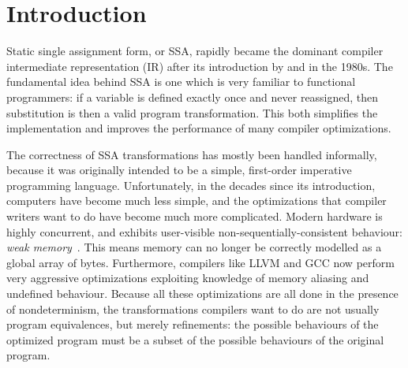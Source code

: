 \documentclass[acmsmall,screen,anonymous,review]{acmart}
\begin{document}

\maketitle

\section{Introduction}

Static single assignment form, or SSA, rapidly became the dominant compiler intermediate
representation (IR) after its introduction by \citet{alpern-ssa-original-88} and
\citet{rosen-gvn-1988} in the 1980s. The fundamental idea behind SSA is one which is very familiar
to functional programmers: if a variable is defined exactly once and never reassigned, then
substitution is then a valid program transformation. This both simplifies the implementation and
improves the performance of many compiler optimizations.

The correctness of SSA transformations has mostly been handled informally, because it was originally
intended to be a simple, first-order imperative programming language. Unfortunately, in the decades
since its introduction, computers have become much less simple, and the optimizations that compiler
writers want to do have become much more complicated. Modern hardware is highly concurrent, and
exhibits user-visible non-sequentially-consistent behaviour: \emph{weak
memory}~\cite{batty-compositional-17}. This means memory can no longer be correctly modelled as a
global array of bytes. Furthermore, compilers like LLVM and GCC now perform very aggressive
optimizations exploiting knowledge of memory aliasing and undefined behaviour.
Because all these optimizations are all done in the presence of nondeterminism, the transformations
compilers want to do are not usually program equivalences, but merely refinements: the possible
behaviours of the optimized program must be a subset of the possible behaviours of the original
program.
\end{document}
